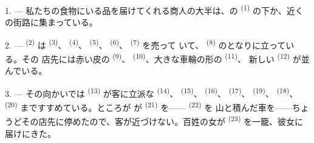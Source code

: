 %
%

\VUsaut{4.0mm}
\VUsaut{3.0mm}

\VUsaut{3.0mm}

1. --- 私たちの食物にいる品を届けてくれる商人の大半は、の
 \textsuperscript{(1)} の下か、近くの街路に集まっている。

2. ---  \textsuperscript{(2)} は \textsuperscript{(3)}、
 \textsuperscript{(4)}、 \textsuperscript{(5)}、
 \textsuperscript{(6)}、 \textsuperscript{(7)} を売って
いて、 \textsuperscript{(8)} のとなりに立っている。その
店先には赤い皮の \textsuperscript{(9)}、
\textsuperscript{(10)}、大きな車輪の形の \textsuperscript{(11)}、
新しい \textsuperscript{(12)} が並んでいる。

3. --- その向かいでは \textsuperscript{(13)} が客に立派な
 \textsuperscript{(14)}、 \textsuperscript{(15)}、
 \textsuperscript{(16)}、 \textsuperscript{(17)}、
 \textsuperscript{(19)}、 \textsuperscript{(18)}、
 \textsuperscript{(20)} まですすめている。ところが
が \textsuperscript{(21)} を—— \textsuperscript{(22)} を
山と積んだ車を——ちょうどその店先に停めたので、客が近づけない。百姓の女が
 \textsuperscript{(23)} を一籠、彼女に届けにきた。

\VUsaut{4.0mm}
\VUsaut{3.0mm}

